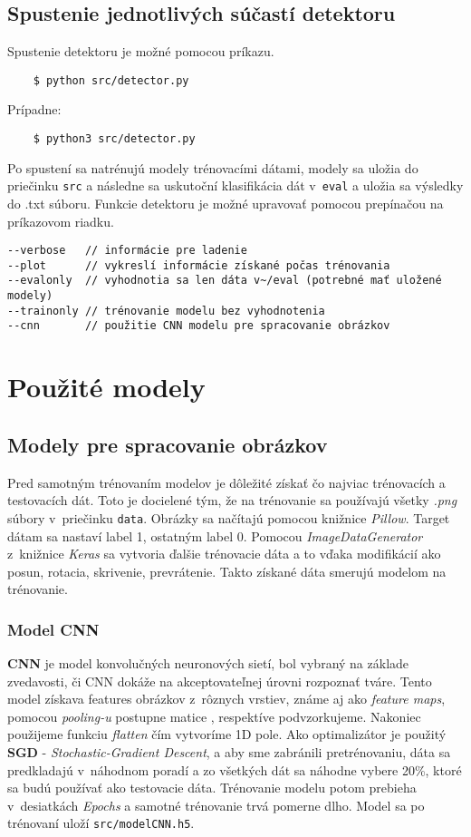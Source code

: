 \documentclass[11pt, a4paper]{article}
\begin{document}
		\subsection{Spustenie jednotlivých súčastí detektoru}
	Spustenie detektoru je možné pomocou príkazu.
			\begin{verbatim}
    $ python src/detector.py
			\end{verbatim}
	Prípadne:
			\begin{verbatim}
    $ python3 src/detector.py
			\end{verbatim}
	Po spustení sa natrénujú modely trénovacími dátami, modely sa uložia do priečinku \texttt{src} a následne sa uskutoční klasifikácia dát v~\texttt{eval} a uložia sa výsledky do .txt súboru.
	Funkcie detektoru je možné upravovať pomocou prepínačou na príkazovom riadku.
			\begin{verbatim}
--verbose   // informácie pre ladenie
--plot      // vykreslí informácie získané počas trénovania 
--evalonly  // vyhodnotia sa len dáta v~/eval (potrebné mať uložené modely)
--trainonly // trénovanie modelu bez vyhodnotenia
--cnn       // použitie CNN modelu pre spracovanie obrázkov
			\end{verbatim}
	\section{Použité modely}
		\subsection{Modely pre spracovanie obrázkov}
		Pred samotným trénovaním modelov je dôležité získať čo najviac trénovacích a testovacích dát. Toto je docielené tým, že na trénovanie sa používajú všetky \emph{.png} súbory v~priečinku \texttt{data}. Obrázky sa načítajú pomocou knižnice \emph{Pillow}. Target dátam sa nastaví label 1, ostatným label 0. Pomocou \emph{ImageDataGenerator} z~knižnice \emph{Keras} sa vytvoria ďalšie trénovacie dáta a to vďaka modifikácií ako posun, rotacia, skrivenie, prevrátenie. Takto získané dáta smerujú modelom na trénovanie. 
\subsubsection{Model CNN}
\textbf{CNN} je model konvolučných neuronových sietí, bol vybraný na základe zvedavosti, či CNN dokáže na akceptovateľnej úrovni rozpoznať tváre. Tento model získava features obrázkov z~rôznych vrstiev, známe aj ako \emph{feature maps}, pomocou \emph{pooling-u} postupne matice , respektíve podvzorkujeme. Nakoniec použijeme funkciu \emph{flatten} čím vytvoríme 1D pole. Ako optimalizátor je použitý \textbf{SGD} - \emph{Stochastic-Gradient Descent}, a aby sme zabránili pretrénovaniu, dáta sa predkladajú v~náhodnom poradí a zo všetkých dát sa náhodne vybere 20\%, ktoré sa budú používať ako testovacie dáta. Trénovanie modelu potom prebieha v~desiatkách \emph{Epochs} a samotné trénovanie trvá pomerne dlho. Model sa po trénovaní uloží \texttt{src/modelCNN.h5}.
\end{document}
